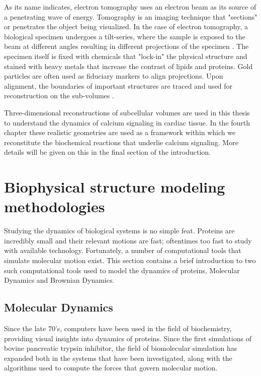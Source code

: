 \documentclass[12pt]{ucsddissertation}
\begin{document}
\begin{dissertationintroduction}
As its name indicates, electron tomography uses an electron beam as its source of a penetrating wave of energy. Tomography is an imaging technique that "sections" or penetrates the object being visualized. In the case of electron tomography, a biological specimen undergoes a tilt-series, where the sample is exposed to the beam at different angles resulting in different projections of the specimen \cite{Fridman2012,Koning2018}. The specimen itself is fixed with chemicals that "lock-in" the physical structure and stained with heavy metals that increase the contrast of lipids and proteins. Gold particles are often used as fiduciary markers to align projections. Upon alignment, the boundaries of important structures are traced and used for reconstruction on the sub-volumes \cite{Yu2008,Lee2018}.

Three-dimensional reconstructions of subcellular volumes are used in this thesis to understand the dynamics of calcium signaling in cardiac tissue\cite{Hayashi2009}. In the fourth chapter these realistic geometries are used as a framework within which we reconstitute the biochemical reactions that underlie calcium signaling. More details will be given on this in the final section of the introduction.   

\section{Biophysical structure modeling methodologies}
Studying the dynamics of biological systems is no simple feat. Proteins are incredibly small and their relevant motions are fast; oftentimes too fast to study with available technology. Fortunately, a number of computational tools that simulate molecular motion exist. This section contains a brief introduction to two such computational tools used to model the dynamics of proteins, Molecular Dynamics and Brownian Dynamics. 

\subsection{Molecular Dynamics}
Since the late 70's, computers have been used in the field of biochemistry, providing visual insights into dynamics of proteins\cite{Levitt1975,McCammon1979}. Since the first simulations of bovine pancreatic trypsin inhibitor, the field of biomolecular simulation has expanded both in the systems that have been investigated, along with the algorithms used to compute the forces that govern molecular motion.


\end{dissertationintroduction}
\end{document}
